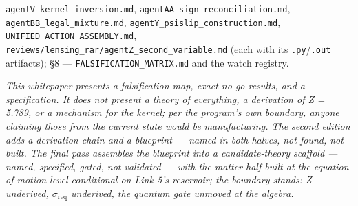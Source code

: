 \documentclass[11pt,a4paper]{article}
\begin{document}
\texttt{agentV\_\allowbreak{}kernel\_\allowbreak{}inversion.md}, \texttt{agentAA\_\allowbreak{}sign\_\allowbreak{}reconciliation.md}, \texttt{agentBB\_\allowbreak{}legal\_\allowbreak{}mixture.md}, \texttt{agentY\_\allowbreak{}psislip\_\allowbreak{}construction.md}, \texttt{UNIFIED\_\allowbreak{}ACTION\_\allowbreak{}ASSEMBLY.md}, \texttt{reviews/\allowbreak{}lensing\_\allowbreak{}rar/\allowbreak{}agentZ\_\allowbreak{}second\_\allowbreak{}variable.md} (each with its \texttt{.py}/\texttt{.out} artifacts); \S{}8 --- \texttt{FALSIFICATION\_\allowbreak{}MATRIX.md} and the watch registry.

\emph{This whitepaper presents a falsification map, exact no-go results, and a specification. It does not present a theory of everything, a derivation of Z = 5.789, or a mechanism for the kernel; per the program's own boundary, anyone claiming those from the current state would be manufacturing. The second edition adds a derivation chain and a blueprint --- named in both halves, not found, not built. The final pass assembles the blueprint into a candidate-theory scaffold --- named, specified, gated, not validated --- with the matter half built at the equation-of-motion level conditional on Link 5's reservoir; the boundary stands: Z underived, $\sigma_{\mathrm{req}}$ underived, the quantum gate unmoved at the algebra.}
\end{document}

